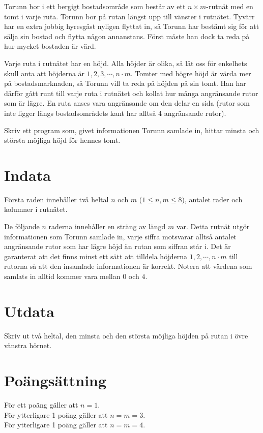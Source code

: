 

\noindent
Torunn bor i ett bergigt bostadsområde som består av ett $n \times m$-rutnät med en tomt i varje ruta.
Torunn bor på rutan längst upp till vänster i rutnätet.
Tyvärr har en extra jobbig hyresgäst nyligen flyttat in, så Torunn har bestämt sig för att sälja sin bostad och flytta någon annanstans.
Först måste han dock ta reda på hur mycket bostaden är värd.

Varje ruta i rutnätet har en höjd. Alla höjder är olika, så låt oss för enkelhets skull anta att höjderna är $1, 2, 3, \cdots, n\cdot m$.
Tomter med högre höjd är värda mer på bostadsmarknaden, så Torunn vill ta reda på höjden på sin tomt. Han har därför gått runt till varje ruta i rutnätet och kollat hur många angränsande rutor som är lägre.
En ruta anses vara angränsande om den delar en sida (rutor som inte ligger längs bostadsområdets kant har alltså $4$ angränsande rutor).

Skriv ett program som, givet informationen Torunn samlade in, hittar minsta och största möjliga höjd för hennes tomt.

\section*{Indata}
Första raden innehåller två heltal $n$ och $m$ ($1 \leq n,m \leq 8$), antalet rader och kolumner i rutnätet.

De följande $n$ raderna innehåller en sträng av längd $m$ var.
Detta rutnät utgör informationen som Torunn samlade in, varje siffra motsvarar alltså antalet angränsande rutor som har lägre höjd än rutan som siffran står i.
Det är garanterat att det finns minst ett sätt att tilldela höjderna $1, 2, \cdots, n\cdot m$ till rutorna så att den insamlade informationen är korrekt.
Notera att värdena som samlats in alltid kommer vara mellan $0$ och $4$.

\section*{Utdata}
Skriv ut två heltal, den minsta och den största möjliga höjden på rutan i övre vänstra hörnet.

\section*{Poängsättning}
För ett poäng gäller att $n = 1$.\\
För ytterligare 1 poäng gäller att $n = m = 3$.\\
För ytterligare 1 poäng gäller att $n = m = 4$.\\
